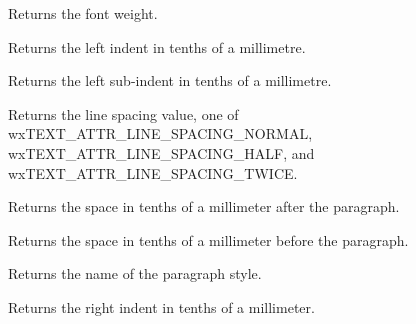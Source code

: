 \label{wxrichtextattrgetfontweight}


Returns the font weight.

\label{wxrichtextattrgetleftindent}


Returns the left indent in tenths of a millimetre.

\label{wxrichtextattrgetleftsubindent}


Returns the left sub-indent in tenths of a millimetre.

\label{wxrichtextattrgetlinespacing}


Returns the line spacing value, one of wxTEXT\_ATTR\_LINE\_SPACING\_NORMAL,
wxTEXT\_ATTR\_LINE\_SPACING\_HALF, and wxTEXT\_ATTR\_LINE\_SPACING\_TWICE.

\label{wxrichtextattrgetparagraphspacingafter}


Returns the space in tenths of a millimeter after the paragraph.

\label{wxrichtextattrgetparagraphspacingbefore}


Returns the space in tenths of a millimeter before the paragraph.

\label{wxrichtextattrgetparagraphstylename}


Returns the name of the paragraph style.

\label{wxrichtextattrgetrightindent}


Returns the right indent in tenths of a millimeter.

\label{wxrichtextattrgettabs}

